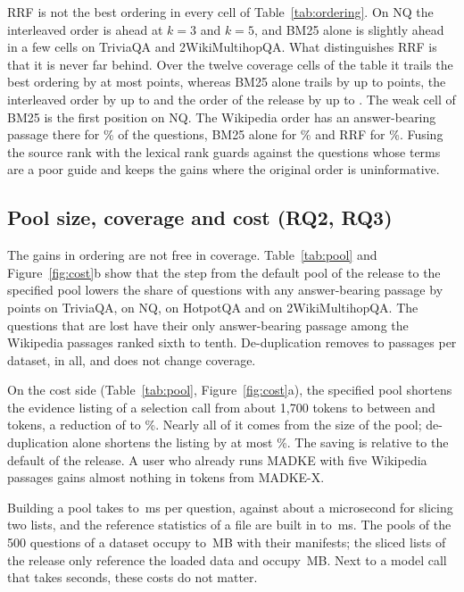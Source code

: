

RRF is not the best ordering in every cell of Table~\ref{tab:ordering}. On NQ the interleaved order is ahead at $k=3$ and $k=5$, and BM25 alone is slightly ahead in a few cells on TriviaQA and 2WikiMultihopQA. What distinguishes RRF is that it is never far behind. Over the twelve coverage cells of the table it trails the best ordering by at most \VWorstGapRrf{} points, whereas BM25 alone trails by up to \VWorstGapBm{} points, the interleaved order by up to \VWorstGapInter{} and the order of the release by up to \VWorstGapOrig. The weak cell of BM25 is the first position on NQ. The Wikipedia order has an answer-bearing passage there for \VCovOneOrigNQ\% of the questions, BM25 alone for \VCovOneBmNQ\% and RRF for \VCovOneRrfNQ\%. Fusing the source rank with the lexical rank guards against the questions whose terms are a poor guide and keeps the gains where the original order is uninformative.

\subsection{Pool size, coverage and cost (RQ2, RQ3)}
\label{sec:r_cost}
The gains in ordering are not free in coverage. Table~\ref{tab:pool} and Figure~\ref{fig:cost}b show that the step from the default pool of the release to the specified pool lowers the share of questions with any answer-bearing passage by \VCoverLossTQA{} points on TriviaQA, \VCoverLossNQ{} on NQ, \VCoverLossHQA{} on HotpotQA and \VCoverLossWMQ{} on 2WikiMultihopQA. The questions that are lost have their only answer-bearing passage among the Wikipedia passages ranked sixth to tenth. De-duplication removes \VDupMin{} to \VDupMax{} passages per dataset, \VDupTotal{} in all, and does not change coverage.



On the cost side (Table~\ref{tab:pool}, Figure~\ref{fig:cost}a), the specified pool shortens the evidence listing of a selection call from about 1,700 tokens to between \VTokXTQA{} and \VTokXWMQ{} tokens, a reduction of \VTokRedMin{} to \VTokRedMax\%. Nearly all of it comes from the size of the pool; de-duplication alone shortens the listing by at most \VTokRedSpecMax\%. The saving is relative to the default of the release. A user who already runs MADKE with five Wikipedia passages gains almost nothing in tokens from MADKE-X.

Building a pool takes \VBuildXMin{} to \VBuildXMax\,ms per question, against about a microsecond for slicing two lists, and the reference statistics of a file are built in \VIndexMsMin{} to \VIndexMsMax\,ms. The pools of the 500 questions of a dataset occupy \VMemXMin{} to \VMemXMax\,MB with their manifests; the sliced lists of the release only reference the loaded data and occupy \VMemRelMax\,MB. Next to a model call that takes seconds, these costs do not matter.

